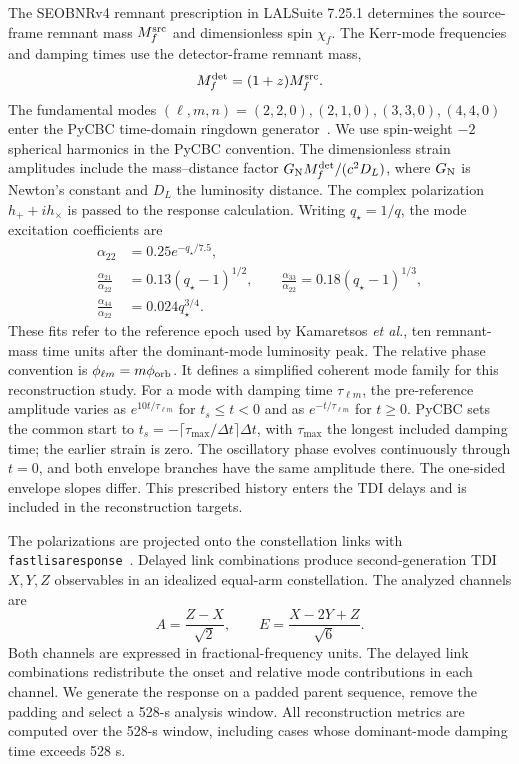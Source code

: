 \documentclass[10pt,prd,aps,a4paper,twocolumn,superscriptaddress,nofootinbib,floatfix]{revtex4-2}
\begin{document}
The SEOBNRv4 remnant prescription in LALSuite 7.25.1 determines the source-frame remnant mass $M_f^{\rm src}$ and dimensionless spin $\chi_f$. The Kerr-mode frequencies and damping times use the detector-frame remnant mass,
\begin{equation}
M_f^{\rm det}=(1+z)M_f^{\rm src}.
\end{equation}
The fundamental modes $(\ell,m,n)=(2,2,0),(2,1,0),(3,3,0),(4,4,0)$ enter the PyCBC time-domain ringdown generator~\cite{berti2006gravitational,berti2009qnm,PyCBCRingdown}. We use spin-weight $-2$ spherical harmonics in the PyCBC convention. The dimensionless strain amplitudes include the mass--distance factor $G_{\rm N}M_f^{\rm det}/(c^2D_L)$, where $G_{\rm N}$ is Newton's constant and $D_L$ the luminosity distance. The complex polarization $h_++ih_\times$ is passed to the response calculation. Writing $q_\star=1/q$, the mode excitation coefficients are~\cite{Kamaretsos2012}
\begin{align}
\alpha_{22}&=0.25e^{-q_\star/7.5},\nonumber\\
\frac{\alpha_{21}}{\alpha_{22}}&=0.13(q_\star-1)^{1/2},\qquad
\frac{\alpha_{33}}{\alpha_{22}}=0.18(q_\star-1)^{1/3},\nonumber\\
\frac{\alpha_{44}}{\alpha_{22}}&=0.024q_\star^{3/4}.
\end{align}
These fits refer to the reference epoch used by Kamaretsos \textit{et al.}, ten remnant-mass time units after the dominant-mode luminosity peak. The relative phase convention is $\phi_{\ell m}=m\phi_{\rm orb}$. It defines a simplified coherent mode family for this reconstruction study. For a mode with damping time $\tau_{\ell m}$, the pre-reference amplitude varies as $e^{10t/\tau_{\ell m}}$ for $t_s\le t<0$ and as $e^{-t/\tau_{\ell m}}$ for $t\ge0$. PyCBC sets the common start to $t_s=-\lceil\tau_{\max}/\Delta t\rceil\Delta t$, with $\tau_{\max}$ the longest included damping time; the earlier strain is zero. The oscillatory phase evolves continuously through $t=0$, and both envelope branches have the same amplitude there. The one-sided envelope slopes differ. This prescribed history enters the TDI delays and is included in the reconstruction targets.

The polarizations are projected onto the constellation links with \texttt{fastlisaresponse}~\cite{Katz2022Response}. Delayed link combinations produce second-generation TDI $X,Y,Z$ observables in an idealized equal-arm constellation. The analyzed channels are
\begin{equation}
A=\frac{Z-X}{\sqrt{2}},\qquad E=\frac{X-2Y+Z}{\sqrt{6}}.\label{eq:aet_convention}
\end{equation}
Both channels are expressed in fractional-frequency units. The delayed link combinations redistribute the onset and relative mode contributions in each channel. We generate the response on a padded parent sequence, remove the padding and select a 528-s analysis window. All reconstruction metrics are computed over the 528-s window, including cases whose dominant-mode damping time exceeds 528 s.
\end{document}
